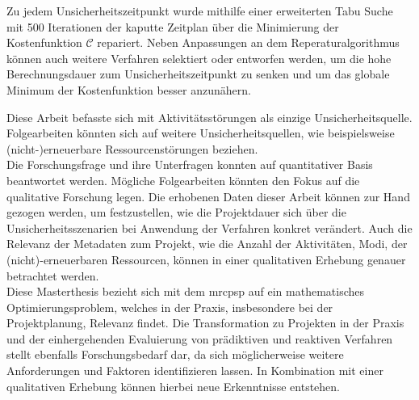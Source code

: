 Zu jedem Unsicherheitszeitpunkt wurde mithilfe einer erweiterten Tabu Suche mit 500 Iterationen der kaputte Zeitplan über die Minimierung der Kostenfunktion $\mathcal{C}$ repariert. Neben Anpassungen an dem Reperaturalgorithmus können auch weitere Verfahren selektiert oder entworfen werden, um die hohe Berechnungsdauer zum Unsicherheitszeitpunkt zu senken und um das globale Minimum der Kostenfunktion besser anzunähern.

Diese Arbeit befasste sich mit Aktivitätsstörungen als einzige Unsicherheitsquelle. Folgearbeiten könnten sich auf weitere Unsicherheitsquellen, wie beispielsweise (nicht-)erneuerbare Ressourcenstörungen beziehen. \\

Die Forschungsfrage und ihre Unterfragen konnten auf quantitativer Basis beantwortet werden. Mögliche Folgearbeiten könnten den Fokus auf die qualitative Forschung legen. Die erhobenen Daten dieser Arbeit können zur Hand gezogen werden, um festzustellen, wie die Projektdauer sich über die Unsicherheitsszenarien bei Anwendung der Verfahren konkret verändert. Auch die Relevanz der Metadaten zum Projekt, wie die Anzahl der Aktivitäten, Modi, der (nicht)-erneuerbaren Ressourcen, können in einer qualitativen Erhebung genauer betrachtet werden. \\  

Diese Masterthesis bezieht sich mit dem \ac{mrcpsp} auf ein mathematisches Optimierungsproblem, welches in der Praxis, insbesondere bei der Projektplanung, Relevanz findet. Die Transformation zu Projekten in der Praxis und der einhergehenden Evaluierung von prädiktiven und reaktiven Verfahren stellt ebenfalls Forschungsbedarf dar, da sich möglicherweise weitere Anforderungen und Faktoren identifizieren lassen. In Kombination mit einer qualitativen Erhebung können hierbei neue Erkenntnisse entstehen.


